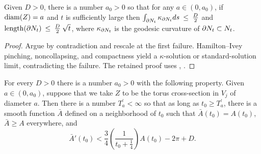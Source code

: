 \begin{lemma}
  \label{lem:kl-incompressibility-cuspidal-tori-existence-kappa-solutions}
 \label{Hamlemma}
Given $D > 0$, there is a number $a_0 > 0$
so that for any $a \in (0,a_0)$, if $\operatorname{diam}(Z) = a$ and $t$ is
sufficiently large then
$\int_{\partial N_t}\kappa_{\partial N_t}ds \: \le \: \frac{D}{2}$ and
$\operatorname{length}(\partial N_t) \: \le \: \frac{D}{2} \: \sqrt{t}$,
where $\kappa_{\partial N_t}$ is the geodesic curvature of
$\partial N_t \subset N_t$.
\end{lemma}

\begin{proof}
\sketch Argue by contradiction and rescale at the first failure. Hamilton--Ivey pinching, noncollapsing, and compactness yield a $\kappa$-solution or standard-solution limit, contradicting the failure.
The retained proof uses \cite[Sections 11 and 12]{Hamiltonn}, \cite[Section 12]{Hamiltonn}.
\end{proof}

\begin{lemma}
  \label{lem:kl-incompressibility-cuspidal-tori-existence-diameter}
 \label{lemsupport}
For every $D>0$ there is a number $a_0>0$ with the following property.
Given $a \in (0, a_0)$, suppose that we take $Z$ to be the torus
cross-section
in $V_j$
of diameter $a$. Then
there is a number $T^\prime_a < \infty$ so that as long as
$t_0\geq T^\prime_a$, there is a smooth function $\bar A$ defined
on a neighborhood of $t_0$ such that $\bar  A(t_0)=A(t_0)$, $\bar A\geq A$
everywhere, and
\begin{equation} \label{dereqn}
\bar A'(t_0)< \frac{3}{4}\left(\frac{1}{t_0+\frac14}\right) A(t_0)-2\pi+D.
\end{equation}
\end{lemma}

